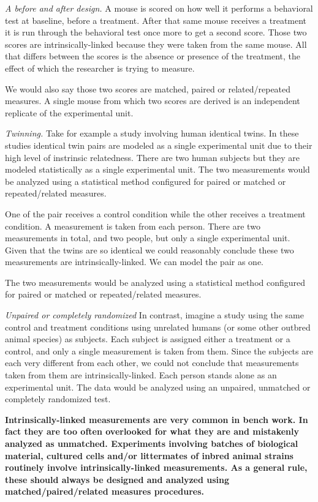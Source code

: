 \documentclass[]{book}
\begin{document}
\emph{A before and after design.} A mouse is scored on how well it performs a behavioral test at baseline, before a treatment. After that same mouse receives a treatment it is run through the behavioral test once more to get a second score. Those two scores are intrinsically-linked because they were taken from the same mouse. All that differs between the scores is the absence or presence of the treatment, the effect of which the researcher is trying to measure.

We would also say those two scores are matched, paired or related/repeated measures. A single mouse from which two scores are derived is an independent replicate of the experimental unit.

\emph{Twinning.} Take for example a study involving human identical twins. In these studies identical twin pairs are modeled as a single experimental unit due to their high level of instrinsic relatedness. There are two human subjects but they are modeled statistically as a single experimental unit. The two measurements would be analyzed using a statistical method configured for paired or matched or repeated/related measures.

One of the pair receives a control condition while the other receives a treatment condition. A measurement is taken from each person. There are two measurements in total, and two people, but only a single experimental unit. Given that the twins are so identical we could reasonably conclude these two measurements are intrinsically-linked. We can model the pair as one.

The two measurements would be analyzed using a statistical method configured for paired or matched or repeated/related measures.

\emph{Unpaired or completely randomized} In contrast, imagine a study using the same control and treatment conditions using unrelated humans (or some other outbred animal species) as subjects. Each subject is assigned either a treatment or a control, and only a single measurement is taken from them. Since the subjects are each very different from each other, we could not conclude that measurements taken from them are intrinsically-linked. Each person stands alone as an experimental unit. The data would be analyzed using an unpaired, unmatched or completely randomized test.

\textbf{Intrinsically-linked measurements are very common in bench work. In fact they are too often overlooked for what they are and mistakenly analyzed as unmatched. Experiments involving batches of biological material, cultured cells and/or littermates of inbred animal strains routinely involve intrinsically-linked measurements. As a general rule, these should always be designed and analyzed using matched/paired/related measures procedures.}
\end{document}
